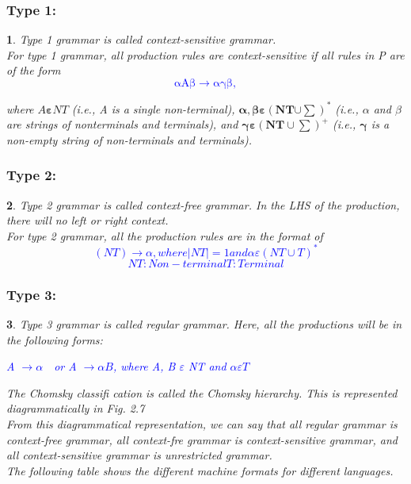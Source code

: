 \documentclass[12pt]{beamer}
\newtheorem{tex}{}
\begin{document}
	
\begin{frame}
	
	\frametitle{Type 1:}
	\begin{tex}
	
	Type 1 grammar is called context-sensitive grammar.\\
	For type 1 grammar, all production rules are context-sensitive if all rules in \textit{P} are of the form
	\textcolor{blue}{
	\[\mathrm{\alpha A\beta \rightarrow \alpha \gamma \beta ,}\] }
	
	where $A \boldsymbol{\varepsilon} NT$ (i.e., A is a single non-terminal), $\mathrm{\boldsymbol{\alpha, \beta \varepsilon (NT \mathrm\cup \sum)^*}}$ (i.e., $\alpha $ and $\beta$ are strings of nonterminals and terminals), and $\boldsymbol{\gamma \varepsilon (NT \cup \sum)}^+$ (i.e., $\boldsymbol{\gamma}$ is a non-empty string of non-terminals and
	terminals).\\
\end{tex}
	
	
\end{frame}	

	
\begin{frame}
	
	\frametitle{Type 2:}
	
	\begin{tex}
	Type 2 grammar is called context-free grammar. In the LHS of the production, there will no left or right context.\\
	For type 2 grammar, all the production rules are in the format of\\
	\textcolor{blue}{
	\[(NT) \rightarrow \alpha, where |NT| = 1 and \alpha \varepsilon (NT \cup T)^*\]
	\[NT : Non-terminal T : Terminal\] }
\end{tex}
	
\end{frame}	



\begin{frame}
	
	\frametitle{Type 3:}
	
	\begin{tex}
	 Type 3 grammar is called regular grammar. Here, all the productions will be in the following forms:\\
	\begin{center}
		\textcolor{blue}{
		A $\rightarrow \alpha \quad  $or A $\rightarrow \alpha B$, where A, B $\varepsilon$ NT and $\alpha \varepsilon T $ }
	\end{center}
	The Chomsky classifi cation is called the Chomsky hierarchy. 
	This is represented diagrammatically in Fig. 2.7\\
	From this diagrammatical representation, we can say that all 
	regular grammar is context-free grammar, all context-fre grammar is context-sensitive grammar, and all context-sensitive grammar is unrestricted grammar.\\
	The following table shows the different machine formats for different languages.\\
\end{tex}
	
\end{frame}	
\end{document}
